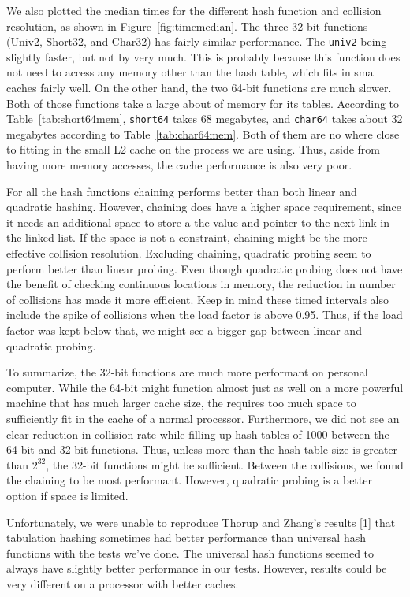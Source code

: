 \documentclass[11pt]{article}
\begin{document}
We also plotted the median times for the different hash function and collision resolution,
as shown in Figure~\ref{fig:timemedian}. The three 32-bit functions 
(Univ2, Short32, and Char32) has fairly similar performance. The \texttt{univ2} 
being slightly faster, but not by very much. This is probably because this 
function does not need to access any memory other than the hash table, 
which fits in small caches fairly well. On the other hand, the two 64-bit functions are much slower.
Both of those functions take a large about of memory for its tables. According 
to Table~\ref{tab:short64mem}, \texttt{short64} takes 68 megabytes, 
and \texttt{char64} takes about 32 megabytes according to Table~\ref{tab:char64mem}.
Both of them are no where close to fitting in the small L2 cache on the process we are using.
Thus, aside from having more memory accesses, the cache performance is also very poor.

For all the hash functions chaining performs better than both linear and quadratic hashing. 
However, chaining does have a higher space requirement, since it needs an 
additional space to store a the value and pointer to the next link in the linked list. 
If the space is not a constraint, chaining might be the more effective collision resolution.
Excluding chaining, quadratic probing seem to perform better than linear probing. 
Even though quadratic probing does not have the benefit of checking continuous
locations in memory, the reduction in number of collisions has made it more efficient.
Keep in mind these timed intervals also include the spike of collisions when the
load factor is above 0.95. Thus, if the load factor was kept below that, 
we might see a bigger gap between linear and quadratic probing.


To summarize, the 32-bit functions are much more performant on personal computer. 
While the 64-bit might function almost just as well on a more powerful machine
that has much larger cache size, the requires too much space to sufficiently fit in the
cache of a normal processor. Furthermore, we did not see an clear reduction in collision
rate while filling up hash tables of 1000 between the 64-bit and 32-bit functions. Thus, unless
more than the hash table size is greater than $2^{32}$, the 32-bit functions might be sufficient. 
Between the collisions, we found the chaining to be most performant. However, quadratic
probing is a better option if space is limited.

Unfortunately, we were unable to reproduce Thorup and Zhang's results [1] that 
tabulation hashing sometimes had better performance than universal hash 
functions with the tests we've done. The universal hash functions seemed to 
always have slightly better performance in our tests. However,
results could be very different on a processor with better caches.
\end{document}
